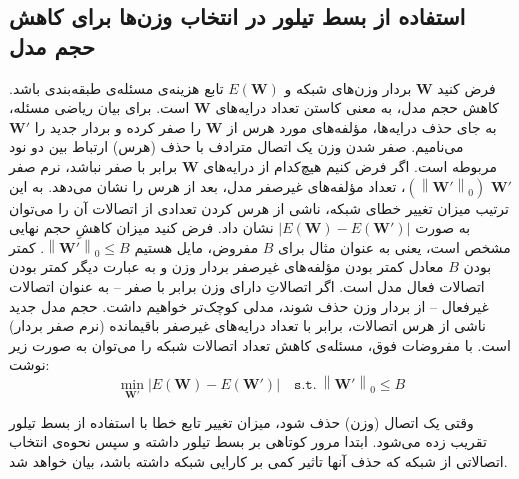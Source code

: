 \documentclass[11pt, twoside]{imsproc}
\newcommand{\norm}[1]{\left\lVert#1\right\rVert}
\begin{document}
\subsection{
استفاده از بسط تیلور در انتخاب وزن‌ها برای کاهش حجم مدل}
\label{sec:model_size_reduction_taylor}
فرض کنید
$\mathbf{W}$
بردار وزن‌های شبکه و
$E(\mathbf{W})$
تابع هزینه‌ی مسئله‌ی طبقه‌بندی باشد.
کاهش حجم مدل، به معنی کاستن تعداد درایه‌های
$\mathbf{W}$
است. برای بیان ریاضی مسئله، به جای حذف درایه‌ها، مؤلفه‌های مورد هرس از
$\mathbf{W}$
را صفر کرده و بردار جدید را
$\mathbf{W'}$
می‌نامیم. صفر شدن وزن یک اتصال مترادف با حذف  (هرس) ارتباط بین دو نود مربوطه است.
اگر فرض کنيم هيچ‌کدام از درايه‌های 
$\mathbf{W}$
برابر با صفر نباشد،
نرم صفر
$\mathbf{W'}$
$(\norm{\mathbf{W'}}_0)$،
تعداد مؤلفه‌های غیرصفر مدل، بعد از هرس را نشان می‌دهد.
به این ترتیب میزان تغییر خطای شبکه، ناشی از هرس کردن تعدادی از اتصالات آن را می‌توان به صورت
$|E(\mathbf{W})-E(\mathbf{W'})|$
نشان داد.
فرض کنید میزان کاهشِ حجم نهایی مشخص است، یعنی به عنوان مثال برای
$B$
مفروض، مایل هستیم
$\norm{\mathbf{W'}}_0 \le B$.
کمتر بودن
$B$
معادل کمتر بودن مؤلفه‌های غیرصفر بردار وزن و به عبارت دیگر کمتر بودن اتصالات فعال مدل است. اگر اتصالاتِ دارای وزن برابر با صفر -- به عنوان اتصالات غیرفعال -- از بردار وزن حذف شوند، مدلی کوچک‌تر خواهیم داشت. حجم مدل جدید ناشی از هرس اتصالات، برابر با تعداد درایه‌های غیرصفر باقیمانده‌ (نرم صفر بردار) است.
با مفروضات فوق، مسئله‌ی کاهش تعداد اتصالات شبکه را می‌توان به صورت زیر نوشت:
\begin{equation}
\min_{\mathbf{W'}} |E(\mathbf{W})-E(\mathbf{W'})| \quad \mathtt{s.t.}\  \norm{\mathbf{W'}}_0 \le B
\label{eq:minEW}
\end{equation}


%
وقتی یک اتصال (وزن) حذف شود، میزان تغییر تابع خطا با استفاده از بسط تیلور تقریب زده می‌شود.
ابتدا مرور کوتاهی بر بسط تیلور داشته و سپس نحوه‌ی انتخاب اتصالاتی از شبکه که حذف آنها تاثیر کمی بر کارایی شبکه داشته باشد، بیان خواهد شد.
\end{document}
